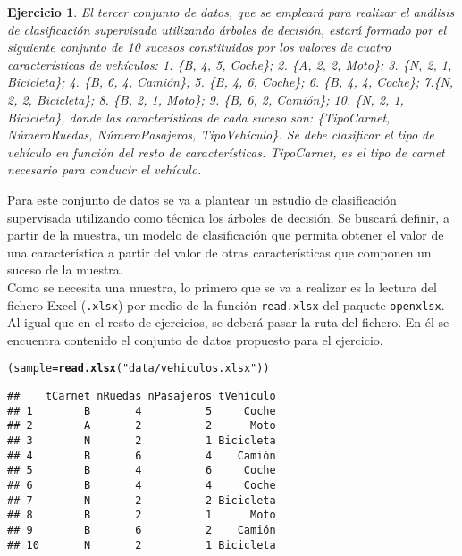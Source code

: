\documentclass[12pt]{report}\usepackage[]{graphicx}\usepackage[dvipsnames]{xcolor}
\makeatletter
\newcommand{\hlstr}[1]{\textcolor[rgb]{0.192,0.494,0.8}{#1}}%
\newcommand{\hlstd}[1]{\textcolor[rgb]{0.345,0.345,0.345}{#1}}%
\newcommand{\hlkwb}[1]{\textcolor[rgb]{0.69,0.353,0.396}{#1}}%
\newcommand{\hlkwd}[1]{\textcolor[rgb]{0.737,0.353,0.396}{\textbf{#1}}}%
\newenvironment{kframe}{%
 \def\at@end@of@kframe{}%
 \ifinner\ifhmode%
  \def\at@end@of@kframe{\end{minipage}}%
  \begin{minipage}{\columnwidth}%
 \fi\fi%
 \def\FrameCommand##1{\hskip\@totalleftmargin \hskip-\fboxsep
 \colorbox{shadecolor}{##1}\hskip-\fboxsep
     \hskip-\linewidth \hskip-\@totalleftmargin \hskip\columnwidth}%
 \MakeFramed {\advance\hsize-\width
   \@totalleftmargin\z@ \linewidth\hsize
   \@setminipage}}%
 {\par\unskip\endMakeFramed%
 \at@end@of@kframe}
\newenvironment{knitrout}{}{} %
\newtheorem{exercise}{Ejercicio}[section]
\makeatother
\begin{document}
 			\begin{exercise}
 				El tercer conjunto de datos, que se empleará para realizar el análisis de clasificación supervisada utilizando árboles de decisión, estará formado por el siguiente conjunto de 10 sucesos constituidos por los valores de cuatro características de vehículos: 1. \{B, 4, 5, Coche\}; 2. \{A, 2, 2, Moto\}; 3. \{N, 2, 1, Bicicleta\}; 4. \{B, 6, 4, Camión\};
 				5. \{B, 4, 6, Coche\}; 6. \{B, 4, 4, Coche\}; 7.\{N, 2, 2, Bicicleta\}; 8. \{B, 2, 1, Moto\}; 9. \{B, 6, 2, Camión\}; 10. \{N, 2, 1, Bicicleta\}, donde las características de cada suceso son: \{TipoCarnet, NúmeroRuedas, NúmeroPasajeros, TipoVehículo\}. Se debe clasificar el tipo de vehículo en función del resto de características. TipoCarnet, es el
 				tipo de carnet necesario para conducir el vehículo.
 			\end{exercise}
 			
 			Para este conjunto de datos se va a plantear un estudio de clasificación supervisada utilizando como técnica los árboles de decisión. Se buscará definir, a partir de la muestra, un modelo de clasificación que permita obtener el valor de una característica a partir del valor de otras características que componen un suceso de la muestra. \\
 			
 			Como se necesita una muestra, lo primero que se va a realizar es la lectura del fichero Excel (\texttt{.xlsx}) por medio de la función \texttt{read.xlsx} del paquete \texttt{openxlsx}. Al igual que en el resto de ejercicios, se deberá pasar la ruta del fichero. En él se encuentra contenido el conjunto de datos propuesto para el ejercicio.
 			
\begin{knitrout}
\color{fgcolor}\begin{kframe}
\begin{alltt}
\hlstd{(sample} \hlkwb{=} \hlkwd{read.xlsx}\hlstd{(}\hlstr{"data/vehiculos.xlsx"}\hlstd{))}
\end{alltt}
\begin{verbatim}
##    tCarnet nRuedas nPasajeros tVehículo
## 1        B       4          5     Coche
## 2        A       2          2      Moto
## 3        N       2          1 Bicicleta
## 4        B       6          4    Camión
## 5        B       4          6     Coche
## 6        B       4          4     Coche
## 7        N       2          2 Bicicleta
## 8        B       2          1      Moto
## 9        B       6          2    Camión
## 10       N       2          1 Bicicleta
\end{verbatim}
\end{kframe}
\end{knitrout}
 			
\end{document}
